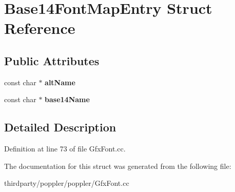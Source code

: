 \hypertarget{struct_base14_font_map_entry}{}\section{Base14\+Font\+Map\+Entry Struct Reference}
\label{struct_base14_font_map_entry}
\subsection*{Public Attributes}
\begin{DoxyCompactItemize}
\item 
\mbox{\label{struct_base14_font_map_entry_af6dc4b387159bbe4ba8f9dd63de396d0}} 
const char $\ast$ {\bfseries alt\+Name}
\item 
\mbox{\label{struct_base14_font_map_entry_ad5c84c8ce41d5685d71eee8233c943db}} 
const char $\ast$ {\bfseries base14\+Name}
\end{DoxyCompactItemize}


\subsection{Detailed Description}


Definition at line 73 of file Gfx\+Font.\+cc.



The documentation for this struct was generated from the following file\+:\begin{DoxyCompactItemize}
\item 
thirdparty/poppler/poppler/Gfx\+Font.\+cc\end{DoxyCompactItemize}
